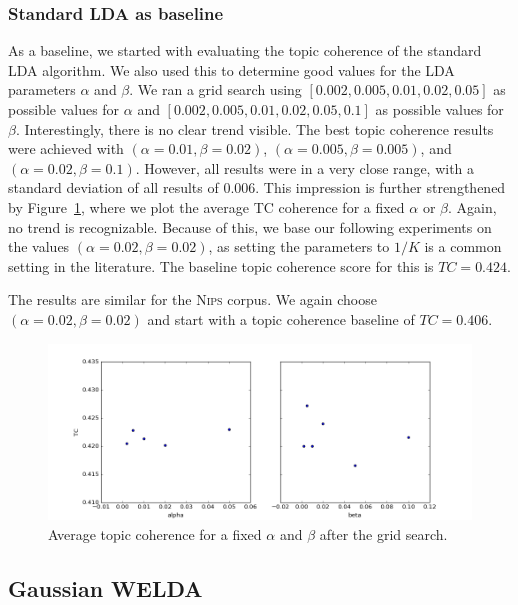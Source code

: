 \documentclass[
        a4paper,
        titlepage,
        twoside,
        parskip
        ]{scrbook}
\theoremstyle{break}
\begin{document}
\subsubsection{Standard LDA as baseline}
As a baseline, we started with evaluating the topic coherence of the standard LDA algorithm.
We also used this to determine good values for the LDA parameters $\alpha$ and $\beta$.
We ran a grid search using $[0.002, 0.005, 0.01, 0.02, 0.05]$ as possible values for $\alpha$ and $[0.002, 0.005, 0.01, 0.02, 0.05, 0.1]$ as possible values for $\beta$.
Interestingly, there is no clear trend visible.
The best topic coherence results were achieved with $(\alpha=0.01,\beta=0.02)$, $(\alpha=0.005,\beta=0.005)$, and $(\alpha=0.02,\beta=0.1)$.
However, all results were in a very close range, with a standard deviation of all results of $0.006$.
This impression is further strengthened by Figure~\ref{fig:standard_lda_alpha_beta}, where we plot the average TC coherence for a fixed $\alpha$ or $\beta$.
Again, no trend is recognizable.
Because of this, we base our following experiments on the values $(\alpha=0.02, \beta=0.02)$, as setting the parameters to $1/K$ is a common setting in the literature.
The baseline topic coherence score for this is $TC = 0.424$.

The results are similar for the \textsc{Nips} corpus.
We again choose $(\alpha=0.02, \beta=0.02)$ and start with a topic coherence baseline of $TC = 0.406$.

\begin{figure}
       \centering
       \includegraphics[width=\textwidth]{figures/standard_lda_alpha_beta.png}
       \caption{Average topic coherence for a fixed $\alpha$ and $\beta$ after the grid search.}
       \label{fig:standard_lda_alpha_beta}
\end{figure}

\subsection{Gaussian WELDA}
\end{document}
